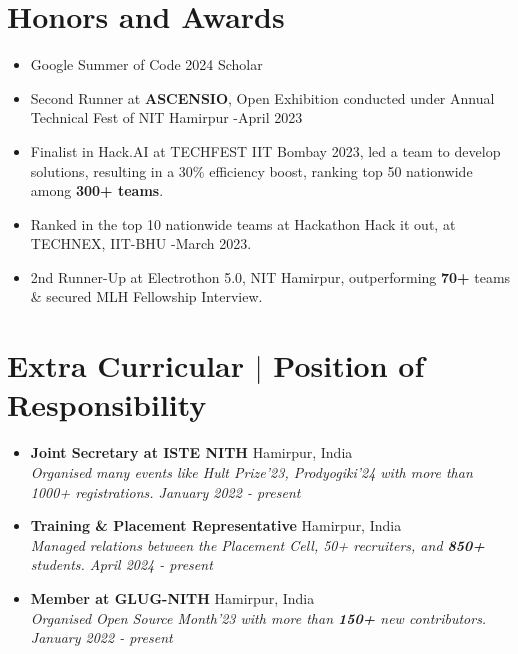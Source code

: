 \documentclass[legalpaper,10.8pt]{article}
\begin{document}
\section{Honors and Awards}
\begin{itemize}[leftmargin=*]
\item Google Summer of Code 2024 Scholar
\item Second Runner at \textbf{ASCENSIO}, Open Exhibition conducted under Annual Technical Fest of NIT Hamirpur -April 2023
\item Finalist in Hack.AI at TECHFEST IIT Bombay 2023, led a team to develop solutions, resulting in a 30\% efficiency boost, ranking top 50 nationwide among \textbf{300+ teams}.
 \item Ranked in the top 10 nationwide teams at Hackathon Hack it out, at TECHNEX, IIT-BHU -March 2023.
\item {2nd Runner-Up at Electrothon 5.0, NIT Hamirpur, outperforming \textbf{70+} teams \& secured MLH Fellowship Interview.}
\end{itemize}

\section{Extra Curricular $|$ \normalsize{Position of Responsibility}}

\begin{itemize}[leftmargin=*, itemsep=0em]
    \item \textbf {Joint Secretary at ISTE NITH} \hfill Hamirpur, India\\
    \textit{Organised many events like Hult Prize'23, Prodyogiki'24 with more than 1000+ registrations. \hfill January 2022 - present}
    
    \item \textbf {Training \& Placement Representative} \hfill Hamirpur, India\\
    \textit{ \small Managed relations between the Placement Cell, 50+ recruiters, and \textbf{850+} students. \hfill April 2024 - present}
    
    \item \textbf{Member at GLUG-NITH} \hfill Hamirpur, India\\
    \textit {\small Organised Open Source Month'23 with more than \textbf{150+} new contributors. \hfill January 2022 - present} 
\end{itemize}
\end{document}
